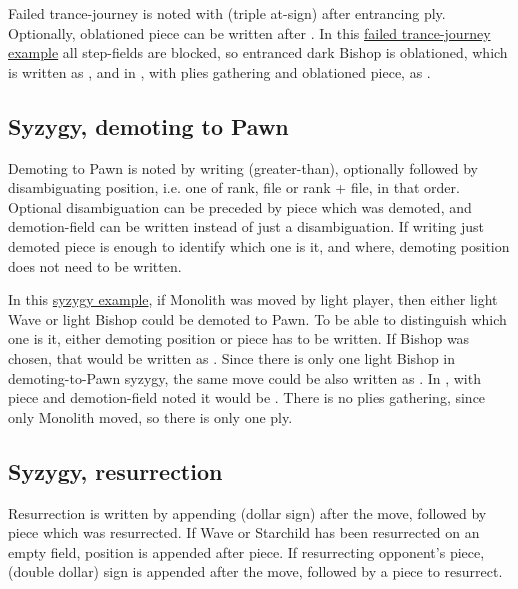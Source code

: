 Failed trance-journey is noted with  (triple at-sign) after entrancing ply.
Optionally, oblationed piece can be written after . In this
\hyperref[fig:scn_o_30_trance_journey_failed_2]{failed trance-journey example} all
step-fields are blocked, so entranced dark Bishop is oblationed, which is written as
, and in , with plies gathering and
oblationed piece, as .

\subsection*{Syzygy, demoting to Pawn}
\label{sec:Appendix/Notation/Syzygy, demoting to Pawn}

Demoting to Pawn is noted by writing \alg{>} (greater-than), optionally followed by
disambiguating position, i.e. one of rank, file or rank + file, in that order. Optional
disambiguation can be preceded by piece which was demoted, and demotion-field can be
written instead of just a disambiguation. If writing just demoted piece is enough to
identify which one is it, and where, demoting position does not need to be written.

In this \hyperref[fig:scn_d_19_syzygy_2_stars_init]{syzygy example}, if Monolith was
moved by light player, then either light Wave or light Bishop could be demoted to Pawn.
To be able to distinguish which one is it, either demoting position or piece has to be
written. If Bishop was chosen, that would be written as . Since there is
only one light Bishop in demoting-to-Pawn syzygy, the same move could be also written
as . In , with piece and demotion-field noted it would be
. There is no plies gathering, since only Monolith moved, so there
is only one ply.

\subsection*{Syzygy, resurrection}
\label{sec:Appendix/Notation/Syzygy, resurrection}

Resurrection is written by appending \alg{\$} (dollar sign) after the move, followed by
piece which was resurrected. If Wave or Starchild has been resurrected on an empty field,
position is appended after piece. If resurrecting opponent's piece, \alg{\$\$} (double
dollar) sign is appended after the move, followed by a piece to resurrect.

